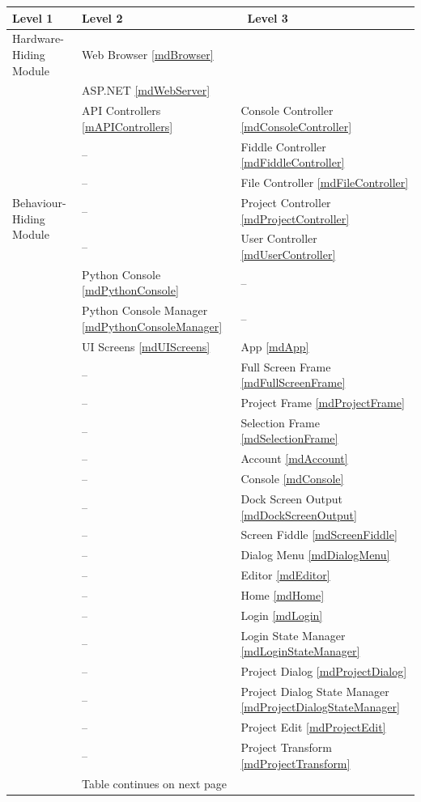 \documentclass[12pt, titlepage]{article}
\begin{document}
\begin{table}[h!]
\centering
\begin{tabular}{p{} p{} p{}}
\toprule
    \textbf{Level 1} & \textbf{Level 2} &\ \textbf{Level 3}\\
\midrule

  {Hardware-Hiding Module} & Web Browser \ref{mdBrowser} \\
  & ASP.NET \ref{mdWebServer} \\
\midrule

\multirow{7}{0.3\textwidth}{
  Behaviour-Hiding Module} & API Controllers \ref{mAPIControllers} & Console Controller \ref{mdConsoleController}\\
& -- & Fiddle Controller \ref{mdFiddleController}\\
    & -- & File Controller \ref{mdFileController}\\
    & -- & Project Controller \ref{mdProjectController}\\
    & -- & User Controller \ref{mdUserController}\\

    & Python Console \ref{mdPythonConsole}  & --\\
    & Python Console Manager \ref{mdPythonConsoleManager} & --\\

    & UI Screens \ref{mdUIScreens} & App \ref{mdApp} \\
    & -- & Full Screen Frame \ref{mdFullScreenFrame} \\
    & -- & Project Frame \ref{mdProjectFrame} \\
    & -- & Selection Frame \ref{mdSelectionFrame}\\
    & -- & Account \ref{mdAccount}\\
    & -- & Console \ref{mdConsole}\\
    & -- & Dock Screen Output \ref{mdDockScreenOutput}\\
    & -- & Screen Fiddle \ref{mdScreenFiddle}\\
    & -- & Dialog Menu \ref{mdDialogMenu}\\
    & -- & Editor \ref{mdEditor}\\
    & -- & Home \ref{mdHome}\\
    & -- & Login \ref{mdLogin}\\
    & -- & Login State Manager \ref{mdLoginStateManager}\\
    & -- & Project Dialog \ref{mdProjectDialog}\\
    & -- & Project Dialog State Manager \ref{mdProjectDialogStateManager}\\
    & -- & Project Edit \ref{mdProjectEdit}\\
    & -- & Project Transform \ref{mdProjectTransform}\\
\bottomrule
    & Table continues on next page & \\
\end{tabular}
\end{table}
\end{document}
